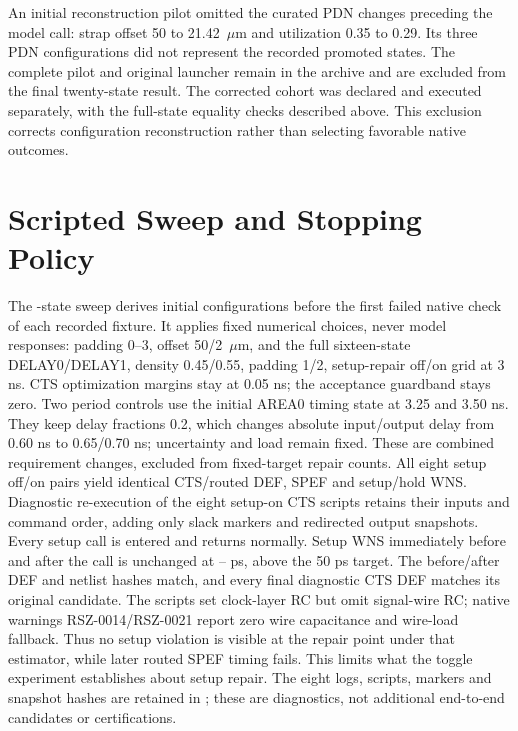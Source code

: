 \documentclass[runningheads]{llncs}
\begin{document}
An initial reconstruction pilot omitted the curated PDN changes preceding
the model call: strap offset 50 to 21.42~$\mu$m and utilization 0.35 to 0.29.
Its three PDN configurations did not represent the recorded promoted states.
The complete pilot and original launcher remain in the archive and are excluded
from the final twenty-state result. The corrected cohort was declared and
executed separately, with the full-state equality checks described above.
This exclusion corrects configuration reconstruction rather than selecting
favorable native outcomes.

\section{Scripted Sweep and Stopping Policy}
The \ScriptedStates{}-state sweep derives initial configurations before the first
failed native check of each recorded fixture. It applies fixed numerical choices,
never model responses: padding 0--3, offset 50/2~$\mu$m, and the full sixteen-state
DELAY0/DELAY1, density 0.45/0.55, padding 1/2, setup-repair off/on grid at 3 ns.
CTS optimization margins stay at 0.05 ns; the acceptance guardband stays zero.
Two period controls use the initial AREA0 timing state at 3.25 and 3.50 ns.
They keep delay fractions 0.2, which changes absolute input/output delay
from 0.60 ns to 0.65/0.70 ns; uncertainty and load remain fixed. These are
combined requirement changes, excluded from fixed-target repair counts.
All eight setup off/on pairs yield identical CTS/routed DEF, SPEF and
setup/hold WNS. Diagnostic re-execution of the eight setup-on CTS scripts
retains their inputs and command order, adding only slack markers and
redirected output snapshots. Every setup call is entered and returns normally.
Setup WNS immediately before and after the call is unchanged at
\SetupRepairPreMinPs--\SetupRepairPreMaxPs{} ps, above the 50 ps target.
The before/after DEF and netlist hashes match, and every final diagnostic
CTS DEF matches its original candidate. The scripts set clock-layer RC
but omit signal-wire RC; native warnings RSZ-0014/RSZ-0021 report zero wire
capacitance and wire-load fallback. Thus no setup violation is visible at
the repair point under that estimator, while later routed SPEF timing fails.
This limits what the toggle experiment establishes about setup repair.
The eight logs, scripts, markers and snapshot hashes are retained in
; these are diagnostics, not
additional end-to-end candidates or certifications.
\end{document}
